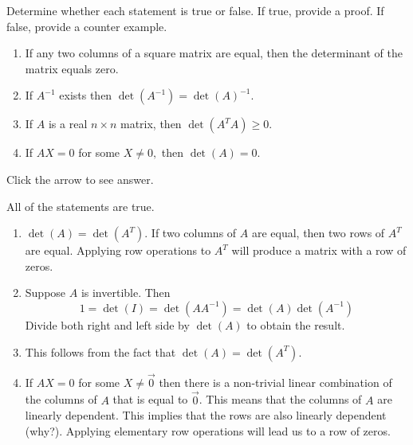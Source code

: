 \documentclass{ximera}
\begin{document}
\begin{problem}\label{prb:7.21} Determine whether each statement is true or false. If true, provide a proof. If false, provide a counter example.
\begin{enumerate}

\item If any two columns of a square matrix are equal, then the determinant
of the matrix equals zero.

\item If $A^{-1}$ exists then $\det \left( A^{-1}\right) =\det \left(
A\right) ^{-1}.$

\item If $A$ is a real $n\times n$ matrix, then $\det \left( A^{T}A\right)
\geq 0.$

\item If $AX=0$ for some $X \neq 0,$ then $\det \left(
A\right) =0.$
\end{enumerate}

Click the arrow to see answer.
\begin{expandable}
All of the statements are true.
\begin{enumerate}
\item $\det(A)=\det(A^T)$.  If two columns of $A$ are equal, then two rows of $A^T$ are equal.  Applying row operations to $A^T$ will produce a matrix with a row of zeros.
\item Suppose $A$ is invertible.  Then 
$$1=\det(I)=\det(AA^{-1})=\det(A)\det(A^{-1})$$  Divide both right and left side by $\det(A)$ to obtain the result.
\item This follows from the fact that $\det(A)=\det(A^T)$.
\item If $AX=0$ for some $X \neq \vec{0}$ then there is a non-trivial linear combination of the columns of $A$ that is equal to $\vec{0}$.  This means that the columns of $A$ are linearly dependent.  This implies that the rows are also linearly dependent (why?).  Applying elementary row operations will lead us to a row of zeros.
\end{enumerate}
\end{expandable}
\end{problem}
\end{document}
